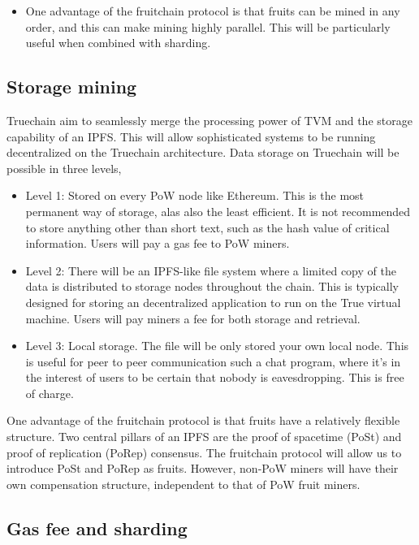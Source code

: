 \documentclass[9pt,oneside]{amsart}
\begin{document}
\begin{multicols}{2}
\begin{itemize}
	\item One advantage of the fruitchain protocol is that fruits can be mined in any order, and this can make mining highly parallel. This will be particularly useful when combined with sharding. 
\end{itemize}


\subsection{Storage mining}

Truechain aim to seamlessly merge the processing power of TVM and the storage capability of an IPFS. This will allow sophisticated systems to be running decentralized on the Truechain architecture. Data storage on Truechain will be possible in three levels, 

\begin{itemize}
	\item Level 1: Stored on every PoW node like Ethereum. This is the most permanent way of storage, alas also the least efficient. It is not recommended to store anything other than short text, such as the hash value of critical information. Users will pay a gas fee to PoW miners. 
	
	\item Level 2: There will be an IPFS-like file system where a limited copy of the data is distributed to storage nodes throughout the chain. This is typically designed for storing an decentralized application to run on the True virtual machine. Users will pay miners a fee for both storage and retrieval.
	
	\item Level 3: Local storage. The file will be only stored your own local node. This is useful for peer to peer communication such a chat program, where it's in the interest of users to be certain that nobody is eavesdropping. This is free of charge. 
\end{itemize}

One advantage of the fruitchain protocol is that fruits have a relatively flexible structure. Two central pillars of an IPFS are the proof of spacetime (PoSt) and proof of replication (PoRep) consensus. The fruitchain protocol will allow us to introduce PoSt and PoRep as fruits. However, non-PoW miners will have their own compensation structure, independent to that of PoW fruit miners. 


\subsection{Gas fee and sharding}


\end{multicols}
\end{document}
